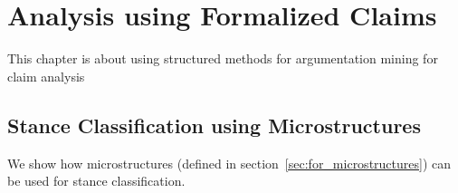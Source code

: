 \chapter{Analysis using Formalized Claims}
\label{chap:analysis}

This chapter is about using structured methods for argumentation mining
for claim analysis \\


\section{Stance Classification using Microstructures}

We show how microstructures (defined in section~\ref{sec:for_microstructures})
can be used for stance classification. 

